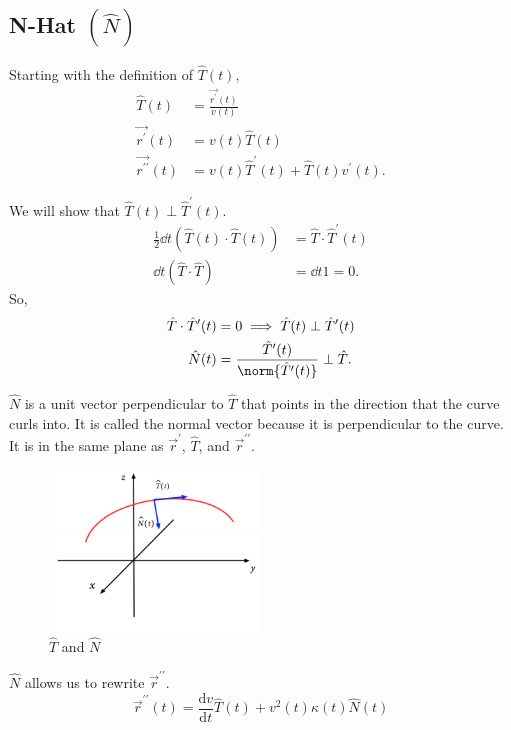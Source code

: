 \subsection{N-Hat $\left(\hat{N}\right)$}
Starting with the definition of $\hat{T}(t)$,
\begin{align*}
	\hat{T}(t) &= \frac{\vec{r^\prime}(t)}{v(t)} \\
	\vec{r^{\prime}}(t) &= v(t)\hat{T}(t) \\
	\vec{r^{\prime\prime}}(t) &= v(t)\hat{T}^{\prime}(t)+\hat{T}(t)v^{\prime}(t).
\end{align*}

\noindent
We will show that $\hat{T}(t) \perp \hat{T}^{\prime}(t)$.
\begin{align*}
	\frac{1}{2}\dd{}{t}\left(\hat{T}(t)\cdot\hat{T}(t)\right) &= \hat{T}\cdot\hat{T}^{\prime}(t) \\
	\dd{}{t}\left(\hat{T}\cdot\hat{T}\right) &= \dd{}{t}1 = 0.
\end{align*}
So,
\begin{align*}
	\hat{T}\cdot\hat{T}^{\prime}(t) &= 0 \implies \hat{T}(t) \perp \hat{T}^{\prime}(t) \\
	\hat{N}(t) &= \frac{\hat{T}^{\prime}(t)}{\norm{\hat{T}^{\prime}(t)}}\perp\hat{T}.
\end{align*}

\noindent
$\hat{N}$ is a unit vector perpendicular to $\hat{T}$ that points in the direction that the curve curls into.
It is called the normal vector because it is perpendicular to the curve.
It is in the same plane as $\vec{r}^\prime$, $\hat{T}$, and  $\vec{r}^{\prime\prime}$.

\begin{figure}[H]
	\label{that_nhat}
	\centering
	\includegraphics[width = 0.5\textwidth]{./vectorValuedFunctions/TN.PNG}
	\caption{$\hat{T}$ and $\hat{N}$}
\end{figure}

\noindent
$\hat{N}$ allows us to rewrite $\vec{r}^{\prime\prime}$.\\
\begin{equation*}
	\vec{r}^{\prime\prime}(t)=\frac{\mathrm{d}v}{\mathrm{d}t}\hat{T}(t)+v^{2}(t)\kappa(t)\hat{N}(t)
\end{equation*}


